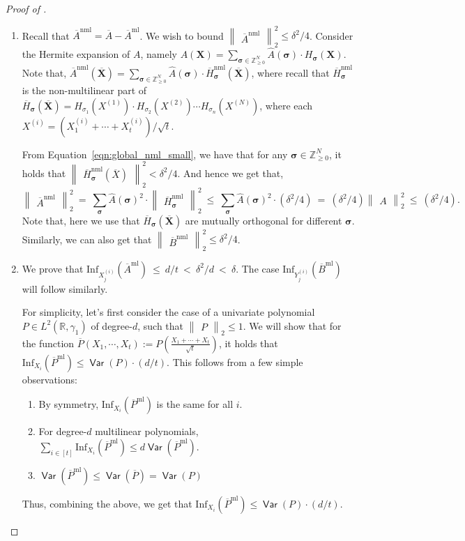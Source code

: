 \documentclass[11pt]{article}
\newcommand{\Red}[1]{\textcolor{red}{#1}}
\newcommand{\inparen}[1]{\left ( #1 \right )}
\newcommand{\norm}[2]{\begin{Vmatrix} #2 \end{Vmatrix}_{#1}}
\DeclareMathOperator*{\Var}{\mathsf{Var}}
\newcommand{\what}[1]{\widehat{#1}}
\newcommand{\bbR}{{\mathbb R}}
\newcommand{\bbZ}{{\mathbb Z}}
\newcommand{\bX}{\mathbf{X}}
\newcommand{\bsigma}{{\boldsymbol \sigma}}
\newcommand{\Inf}{\mathrm{Inf}}
\newcommand{\ml}{\mathrm{ml}}
\newcommand{\nml}{\mathrm{nml}}
\begin{document}
\begin{proof}[Proof of ]
\begin{enumerate}
		\item Recall that $\overline{A}^{\nml} = \overline{A} - \overline{A}^{\mathrm{ml}}$. We wish to bound $\norm{2}{\overline{A}^{\nml}}^2 \le \delta^2/4$. Consider the Hermite expansion of $A$, namely $A(\bX) = \sum_{\bsigma \in \bbZ_{\ge 0}^N} \what{A}(\bsigma) \cdot H_{\bsigma}(\bX)$. Note that, $\overline{A}^{\nml}\inparen{\overline{\bX}} = \sum_{\bsigma \in \bbZ_{\ge 0}^N} \what{A}(\bsigma) \cdot \overline{H}^{\nml}_{\bsigma}\inparen{\overline{\bX}}$, where recall that $\overline{H}_{\bsigma}^{\nml}$ is the non-multilinear part of $\overline{H}_{\bsigma}\inparen{\overline{\bX}} = H_{\sigma_1}(X^{(1)}) \cdot H_{\sigma_2}(X^{(2)}) \cdots H_{\sigma_n}(X^{(N)})$, where each $X^{(i)} = \inparen{X^{(i)}_1 + \cdots + X^{(i)}_t}/\sqrt{t}$.
		
		From Equation~\ref{eqn:global_nml_small}, we have that for any $\bsigma \in \bbZ_{\ge 0}^N$, it holds that $\norm{2}{\overline{H}_{\bsigma}^{\nml}\inparen{\overline{X}}}^2 < \delta^2/4$. And hence we get that,
		\[ \norm{2}{\overline{A}^{\nml}}^2 ~=~ \sum_{\bsigma} \what{A}(\bsigma)^2 \cdot \norm{2}{\overline{H}_{\bsigma}^{\nml}}^2 ~\le~ \sum_{\bsigma} \what{A}(\bsigma)^2 \cdot (\delta^2/4) ~=~ (\delta^2/4) \norm{2}{A}^2 ~\le~ (\delta^2/4). \]
		Note that, here we use that $\overline{H}_{\bsigma}(\overline{\bX})$ are mutually orthogonal for different $\bsigma$. Similarly, we can also get that $\norm{2}{\overline{B}^{\nml}}^2 \le \delta^2/4$.
		
		\item We prove that $\Inf_{X^{(i)}_j}\inparen{\overline{A}^{\ml}} ~\le~ d/t ~<~ \delta^2/d ~<~ \delta$. The case $\Inf_{Y^{(i)}_j}\inparen{\overline{B}^{\ml}}$ will follow similarly.
		
		For simplicity, let's first consider the case of a univariate polynomial $P \in L^2(\bbR, \gamma_1)$ of degree-$d$, such that $\norm{2}{P} \le 1$. We will show that for the function $\overline{P}(X_1, \cdots, X_t) := P \inparen{\frac{X_1 + \cdots + X_t}{\sqrt{t}}}$, it holds that $\Inf_{X_i}\inparen{\overline{P}^{\ml}} \le \Var(P)\cdot (d/t)$. This follows from a few simple observations:
		\begin{enumerate}
			\item By symmetry, $\Inf_{X_i}\inparen{\overline{P}^{\ml}}$ is the same for all $i$.
			\item For degree-$d$ multilinear polynomials, $\sum_{i \in [t]} \Inf_{X_i}\inparen{\overline{P}^{\ml}} \le d \Var\inparen{\overline{P}^{\ml}}$. %
			\item $\Var\inparen{\overline{P}^{\ml}} \le \Var\inparen{\overline{P}} = \Var(P)$
		\end{enumerate}
		Thus, combining the above, we get that $\Inf_{X_i}\inparen{\overline{P}^{\ml}} \le \Var(P)\cdot (d/t)$.\\
		

\end{enumerate}
\end{proof}
\end{document}
